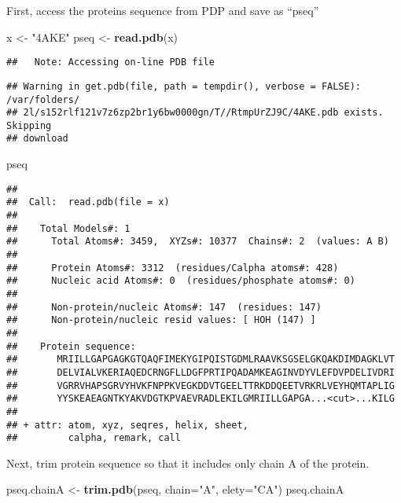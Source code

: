 \documentclass[]{article}
\newenvironment{Shaded}{\begin{snugshade}}{\end{snugshade}}
\newcommand{\KeywordTok}[1]{\textcolor[rgb]{0.13,0.29,0.53}{\textbf{#1}}}
\newcommand{\DataTypeTok}[1]{\textcolor[rgb]{0.13,0.29,0.53}{#1}}
\newcommand{\StringTok}[1]{\textcolor[rgb]{0.31,0.60,0.02}{#1}}
\newcommand{\NormalTok}[1]{#1}
\begin{document}
First, access the proteins sequence from PDP and save as ``pseq''

\begin{Shaded}
\begin{Highlighting}[]
\NormalTok{x <-}\StringTok{ "4AKE"}
\NormalTok{pseq <-}\StringTok{ }\KeywordTok{read.pdb}\NormalTok{(x)}
\end{Highlighting}
\end{Shaded}

\begin{verbatim}
##   Note: Accessing on-line PDB file
\end{verbatim}

\begin{verbatim}
## Warning in get.pdb(file, path = tempdir(), verbose = FALSE): /var/folders/
## 2l/s152rlf121v7z6zp2br1y6bw0000gn/T//RtmpUrZJ9C/4AKE.pdb exists. Skipping
## download
\end{verbatim}

\begin{Shaded}
\begin{Highlighting}[]
\NormalTok{pseq}
\end{Highlighting}
\end{Shaded}

\begin{verbatim}
## 
##  Call:  read.pdb(file = x)
## 
##    Total Models#: 1
##      Total Atoms#: 3459,  XYZs#: 10377  Chains#: 2  (values: A B)
## 
##      Protein Atoms#: 3312  (residues/Calpha atoms#: 428)
##      Nucleic acid Atoms#: 0  (residues/phosphate atoms#: 0)
## 
##      Non-protein/nucleic Atoms#: 147  (residues: 147)
##      Non-protein/nucleic resid values: [ HOH (147) ]
## 
##    Protein sequence:
##       MRIILLGAPGAGKGTQAQFIMEKYGIPQISTGDMLRAAVKSGSELGKQAKDIMDAGKLVT
##       DELVIALVKERIAQEDCRNGFLLDGFPRTIPQADAMKEAGINVDYVLEFDVPDELIVDRI
##       VGRRVHAPSGRVYHVKFNPPKVEGKDDVTGEELTTRKDDQEETVRKRLVEYHQMTAPLIG
##       YYSKEAEAGNTKYAKVDGTKPVAEVRADLEKILGMRIILLGAPGA...<cut>...KILG
## 
## + attr: atom, xyz, seqres, helix, sheet,
##         calpha, remark, call
\end{verbatim}

Next, trim protein sequence so that it includes only chain A of the
protein.

\begin{Shaded}
\begin{Highlighting}[]
\NormalTok{pseq.chainA <-}\StringTok{ }\KeywordTok{trim.pdb}\NormalTok{(pseq, }\DataTypeTok{chain=}\StringTok{"A"}\NormalTok{, }\DataTypeTok{elety=}\StringTok{"CA"}\NormalTok{)}
\NormalTok{pseq.chainA}
\end{Highlighting}
\end{Shaded}
\end{document}
